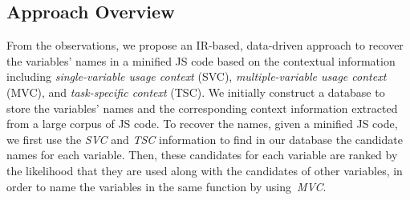 \subsection{Approach Overview}

From the observations, we propose an IR-based, data-driven approach to
recover the variables' names in a minified JS code based
on the contextual information
including \textit{single-variable usage context} (SVC),
\textit{multiple-variable usage context} (MVC), and
\textit{task-specific context} (TSC).
%
We initially construct a database to store
the variables' names and the corresponding context information
extracted from a large corpus of JS code.
%
To recover the names, given a minified JS code, we first use
the \textit{SVC} and \textit{TSC} information to find in our
database the candidate names for each variable. Then, these candidates
for each variable are ranked by the likelihood that they are used
along with the candidates of other variables, in order to name the
variables in the same function by using~\textit{MVC}.
